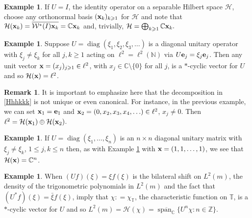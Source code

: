 \documentclass{dis}
\theoremstyle{plain}
\theoremstyle{definition}
\newtheorem{Example}[equation]{Example}
\newtheorem{Remark}[equation]{Remark}
\def\C{\mathbb{C}}
\def\T{\mathbb{T}}
\def\N{\mathbb{N}}
\def\Z{\mathbb{Z}}
\renewcommand{\leq}{\leqslant}
\renewcommand{\geq}{\geqslant}
\renewcommand{\vec}[1]{{\bf #1}}
\newcommand{\0}{{\color{lightgray}0}}
\begin{document}
\begin{Example}\label{9erufgjdefght}
If $U = I$, the identity operator on a separable Hilbert space $\mathcal{H}$, choose any orthonormal basis $(\vec{x}_k)_{k \geq 1}$ for $\mathcal{H}$ and note that
$\mathcal{H}(\vec{x}_{k}) = \overline{\mathcal{W}^{*}(I) \vec{x}_k}  = \C \vec{x}_k$
and, trivially, $\mathcal{H} = \bigoplus_{k \geq 1} \C \vec{x}_k.$
\end{Example}

\begin{Example}\label{nnBBvv665}
Suppose $U = \operatorname{diag}(\xi_1, \xi_2, \xi_3, \ldots)$ is a diagonal unitary operator with $\xi_j \not = \xi_k$ for all $j, k \geq 1$ acting on $\ell^2  = \ell^2(\N)$ via $U \vec{e}_{j} = \xi_j \vec{e}_j$. Then any  unit vector $\vec{x} = (x_j)_{j \geq 1} \in \ell^2$, with $x_j \in \C \setminus \{0\}$ for all $j$, is a $\ast$-cyclic vector for $U$ and so $\mathcal{H}(\vec{x}) = \ell^2$.
\end{Example}

\begin{Remark}
It is important to emphasize here that the decomposition in \eqref{Hhhkkk} is not unique or even canonical. For instance, in the previous example, we can set $\vec{x}_1 = \vec{e}_1$ and $\vec{x}_2 = (0, x_2, x_3, x_4, \ldots) \in \ell^2$, $x_j \not = 0$. Then $\ell^2 = \mathcal{H}(\vec{x}_1) \oplus \mathcal{H}(\vec{x}_2)$.
\end{Remark}

\begin{Example}
If $U = \operatorname{diag}(\xi_1, \ldots, \xi_n)$ is an $n \times n$ diagonal unitary matrix with $\xi_j \not = \xi_k$, $1 \leq j, k \leq n$ then, as with Example \ref{nnBBvv665} with $\vec{x} = (1, 1, \ldots, 1)$, we see that  $\mathcal{H}(\vec{x}) = \C^{n}$. 
\end{Example}

\begin{Example}\label{bliexample9}
When $(U f)(\xi) = \xi f(\xi)$ is the bilateral shift on $L^2(m)$, the density of the trigonometric polynomials in $L^2(m)$ and the fact that $(U^{*} f)(\xi) = \bar \xi f(\xi)$, imply that $\chi : = \chi_{\T}$, the characteristic function on $\T$, is a $\ast$-cyclic vector for $U$ and so
$L^2(m) = \mathcal{H}(\chi) = \overline{\operatorname{span}_{\C}}\{U^n \chi: n \in \Z\}$.
\end{Example}
\end{document}
